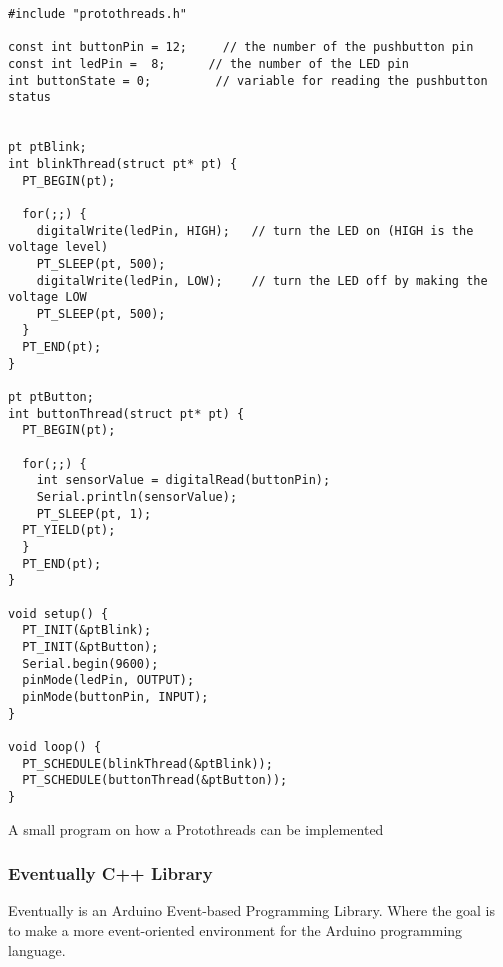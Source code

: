 \begin{listing}[htb!]
\centering
\begin{verbatim}
#include "protothreads.h"

const int buttonPin = 12;     // the number of the pushbutton pin
const int ledPin =  8;      // the number of the LED pin
int buttonState = 0;         // variable for reading the pushbutton status


pt ptBlink;
int blinkThread(struct pt* pt) {
  PT_BEGIN(pt);

  for(;;) {
    digitalWrite(ledPin, HIGH);   // turn the LED on (HIGH is the voltage level)
    PT_SLEEP(pt, 500);
    digitalWrite(ledPin, LOW);    // turn the LED off by making the voltage LOW
    PT_SLEEP(pt, 500);
  }
  PT_END(pt);
}

pt ptButton;
int buttonThread(struct pt* pt) {
  PT_BEGIN(pt);

  for(;;) {
    int sensorValue = digitalRead(buttonPin);
    Serial.println(sensorValue);
    PT_SLEEP(pt, 1);
  PT_YIELD(pt);
  }
  PT_END(pt);
}

void setup() {
  PT_INIT(&ptBlink);
  PT_INIT(&ptButton);
  Serial.begin(9600);
  pinMode(ledPin, OUTPUT);
  pinMode(buttonPin, INPUT);
}

void loop() {
  PT_SCHEDULE(blinkThread(&ptBlink));
  PT_SCHEDULE(buttonThread(&ptButton));
}
\end{verbatim}
\caption{A small program on how a Protothreads can be implemented}
\label{List: Protothreads example}
\end{listing}

\cleardoublepage




\subsubsection{Eventually C++ Library}
Eventually is an Arduino Event-based Programming Library. Where the goal is to make a more event-oriented environment for the Arduino programming language.

